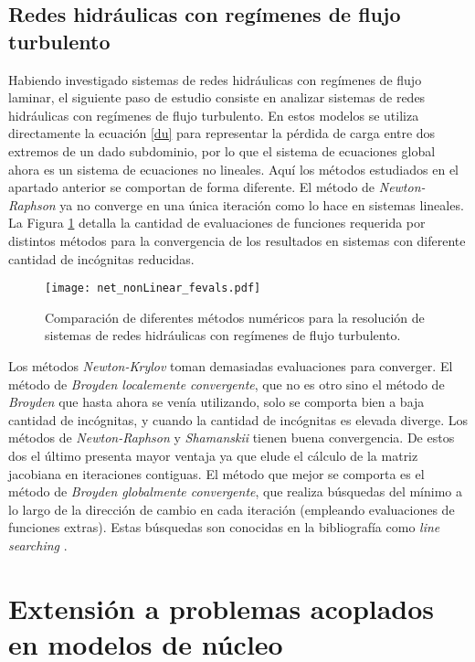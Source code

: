 \subsection*{Redes hidráulicas con regímenes de flujo turbulento}
\label{turbulent}

Habiendo investigado sistemas de redes hidráulicas con regímenes de flujo laminar,
el siguiente paso de estudio consiste en analizar sistemas de redes hidráulicas con regímenes de flujo turbulento.
En estos modelos se utiliza directamente la ecuación \ref{du} para representar la pérdida de carga entre dos extremos de un dado subdominio,
por lo que el sistema de ecuaciones global ahora es un sistema de ecuaciones no lineales.
Aquí los métodos estudiados en el apartado anterior se comportan de forma diferente.
El método de \textit{Newton-Raphson} ya no converge en una única iteración como lo hace en sistemas lineales.
La Figura \ref{net_nonLinear_fevals} detalla la cantidad de evaluaciones de funciones requerida por distintos métodos
para la convergencia de los resultados en sistemas con diferente cantidad de incógnitas reducidas.

\begin{figure}[ht]
\centering
\texttt{[image: net\_nonLinear\_fevals.pdf]}
\caption[Comparación de diferentes métodos numéricos para la resolución de sistemas de redes hidráulicas con regímenes de flujo turbulento]
{Comparación de diferentes métodos numéricos para la resolución de sistemas de redes hidráulicas con regímenes de flujo turbulento.}  
\label{net_nonLinear_fevals}
\end{figure}

Los métodos \textit{Newton-Krylov} toman demasiadas evaluaciones para converger.
El método de \textit{Broyden localemente convergente}, que no es otro sino el método de \textit{Broyden} que hasta ahora se venía utilizando,
solo se comporta bien a baja cantidad de incógnitas, y cuando la cantidad de incógnitas es elevada diverge.
Los métodos de \textit{Newton-Raphson} y \textit{Shamanskii} tienen buena convergencia.
De estos dos el último presenta mayor ventaja ya que elude el cálculo de la matriz jacobiana en iteraciones contiguas.
El método que mejor se comporta es el método de \textit{Broyden globalmente convergente},
que realiza búsquedas del mínimo a lo largo de la dirección de cambio en cada iteración (empleando evaluaciones de funciones extras).
Estas búsquedas son conocidas en la bibliografía como \textit{line searching} \cite{kelley}.

\section{Extensión a problemas acoplados en modelos de núcleo}
\label{3:extension-nucleo}

